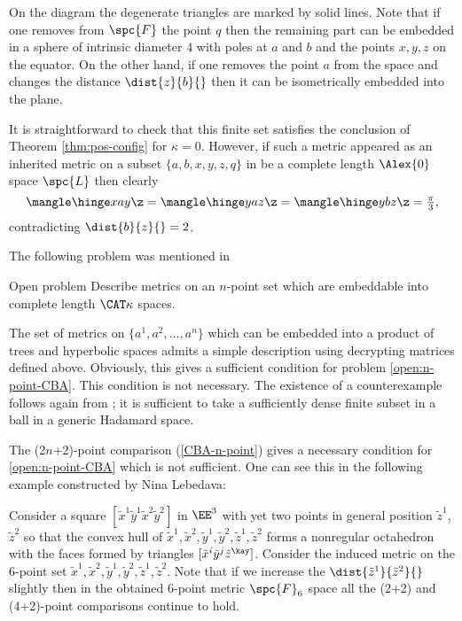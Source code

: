 On the diagram the degenerate triangles are marked by solid lines.
Note that if one removes from $\spc{F}$ the point $q$ then the remaining part can be embedded in a sphere of intrinsic diameter $4$ with poles at $a$ and $b$ and the points $x,y,z$ on the equator.
On the other hand, if one removes the  point $a$ from the space and changes the distance $\dist{z}{b}{}$ then it can be isometrically embedded into  the plane.

It is straightforward to check that this finite set satisfies the conclusion of Theorem \ref{thm:pos-config} for $\kappa=0$.
However, if such a metric appeared as an inherited metric on a subset $\{a,b,x,y,z,q\}$ in  be a complete length $\Alex{0}$ space $\spc{L}$
then clearly  
\[
\mangle\hinge x a y\z
=
\mangle\hinge y a z\z
=
\mangle\hinge y b z\z
= 
\tfrac{\pi}{3},
\]
contradicting $\dist{b}{z}{}=2$.

\medskip

The following problem was mentioned in \cite[15(b)]{gromov-CAT}


\begin{thm}{Open problem}\label{open:n-point-CBA}
Describe metrics on an $n$-point set which are embeddable into complete length $\CAT\kappa$ spaces.
\end{thm}

The set of metrics on $\{a^1,a^2,\dots,a^n\}$ which can be embedded into a product of trees and hyperbolic spaces admits a simple description using decrypting matrices defined above.
Obviously, this gives a sufficient condition for problem \ref{open:n-point-CBA}.
This  condition is not necessary.
The existence of a counterexample follows again
from \cite[2.2]{vilms};
it is sufficient to take a sufficiently dense finite subset 
in a ball in a generic Hadamard space.

The (2$n$+2)-point comparison (\ref{CBA-n-point}) gives a necessary condition for \ref{open:n-point-CBA} 
which is not sufficient.
One can see this in the following example constructed by Nina Lebedava:

Consider a square $[\tilde x^1\tilde y^1\tilde x^2\tilde y^2]$ in $\EE^3$
with yet two points in general position $\tilde z^1$, $\tilde z^2$ so that the convex hull of $\tilde x^1,\tilde x^2,\tilde y^1,\tilde y^2,\tilde z^1,\tilde z^2$ forms a nonregular octahedron with the faces formed by triangles $[\tilde x^i \tilde y^j \tilde z^\kay]$.
Consider the induced metric on the 6-point set $\tilde x^1,\tilde x^2,\tilde y^1,\tilde y^2,\tilde z^1,\tilde z^2$.
Note that if we increase the $\dist{\tilde z^1}{\tilde z^2}{}$ slightly 
then in the obtained 6-point metric $\spc{F}_6$ space all the (2+2) and (4+2)-point comparisons continue to hold.

